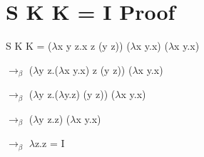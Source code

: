 \documentclass{article}
\begin{document}
\section{S K K = I Proof}
{\Large S K K = ($\lambda$x y z.x z (y z)) ($\lambda$x y.x) ($\lambda$x y.x) \par
$\rightarrow_\beta$ ($\lambda$y z.($\lambda$x y.x) z (y z)) ($\lambda$x y.x) \par
$\rightarrow_\beta$ ($\lambda$y z.($\lambda$y.z) (y z)) ($\lambda$x y.x) \par
$\rightarrow_\beta$ ($\lambda$y z.z) ($\lambda$x y.x) \par
$\rightarrow_\beta$ $\lambda$z.z = I}
\end{document}
